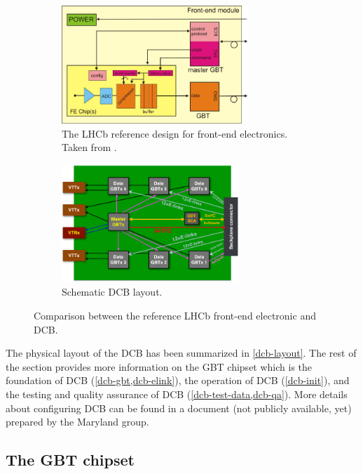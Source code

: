 \begin{figure}[!htb]
    \centering
    \begin{subfigure}[t]{0.46\textwidth}
        \centering
        \includegraphics[height=12em]{./figs-ut-upgrade/dcb/lhcb_ref_fe.pdf}
        \caption{
            The LHCb reference design for front-end electronics.
            Taken from \cite{Wyllie:2011sya}.
        }
        \label{fig:lhcb-ref-fe}
    \end{subfigure}
    \hfill
    \begin{subfigure}[t]{0.46\textwidth}
        \centering
        \includegraphics[height=12em]{./figs-ut-upgrade/dcb/dcb_schematic.pdf}
        \caption{
            Schematic DCB layout.
        }
        \label{fig:dcb-schematic}
    \end{subfigure}

    \caption{
        Comparison between the reference LHCb front-end electronic and DCB.
    }
\end{figure}

The physical layout of the DCB has been summarized in \cref{dcb-layout}.
The rest of the section provides more information
on the GBT chipset which is the foundation of DCB (\cref{dcb-gbt,dcb-elink}),
the operation of DCB (\cref{dcb-init}),
and the testing and quality assurance of DCB (\cref{dcb-test-data,dcb-qa}).
More details about configuring DCB can be found in a document
(not publicly available, yet) prepared by the Maryland group.


\subsection{The GBT chipset}
\label{dcb-gbt}

